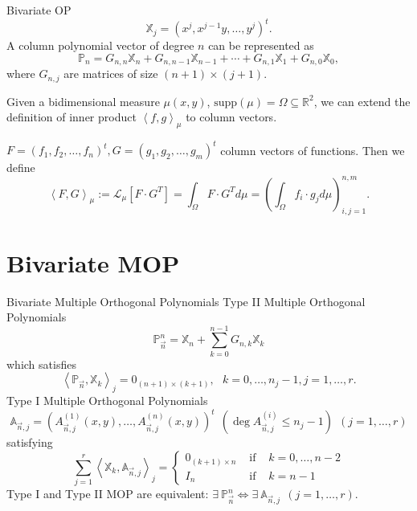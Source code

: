\documentclass[compress,aspectratio=169]{beamer}
\newcommand{\R}[0]{\mathbb{R}}
\newcommand{\supp}[0]{\mathrm{supp}}
\newcommand{\prodesc}[2]{\left\langle #1 , #2 \right\rangle}
\begin{document}
\begin{frame}{Bivariate OP}
  $$
  \mathbb{X}_j=(x^j, x^{j-1}y , \dots, y^j)^t.
  $$
  A column polynomial vector of degree $n$ can be represented as
  $$
  \mathbb{P}_n = G_{n,n}\mathbb{X}_n + G_{n,n-1}\mathbb{X}_{n-1}+\cdots + G_{n,1}\mathbb{X}_1 + G_{n,0}\mathbb X_0,
  $$
  where $G_{n,j}$ are matrices of size $(n+1)\times(j+1)$. 

  Given a bidimensional measure $\mu(x,y)$, $\supp(\mu)=\Omega\subseteq\R^2$, we can extend the definition of inner product $\prodesc{f}{g}_\mu$ to column vectors.
  
  $F=(f_1,f_2,\dots,f_n)^t, G=(g_1,g_2,\dots, g_m)^t$ column vectors of functions. Then we define
  \begin{equation}
    \label{eq:prodesc-matrix}
    \prodesc{F}{G}_\mu :=\mathcal{L}_\mu[F\cdot G^T] = \int_\Omega F\cdot G^T d\mu = \left(\int_\Omega f_i\cdot g_j d\mu\right)_{i,j=1}^{n,m}.
  \end{equation}
	
\end{frame}

\section*{Bivariate MOP}

\begin{frame}{Bivariate Multiple Orthogonal Polynomials}
	\alert{Type II Multiple Orthogonal Polynomials}
	$$\mathbb P^n_{\vec n} = \mathbb X_n + \displaystyle\sum_{k=0}^{n-1}G_{n,k} \mathbb X_k$$ which satisfies
	\begin{equation}
		\label{eq:typeII-MOP-d-variables}
		\prodesc{\mathbb P_{\vec n}}{\mathbb X_k}_j = 0_{(n+1)\times (k+1)}, \ \ \ k=0,\dots,n_j-1, j=1,\dots,r.
	\end{equation}
	\alert{Type I Multiple Orthogonal Polynomials}
	$$\mathbb A_{\vec n,j} = (A_{\vec n, j}^{(1)}(x,y), \dots, A_{\vec n, j}^{(n)}(x,y))^t \ \ (\deg A_{\vec n, j}^{(i)}\leq n_j-1)\ \ (j=1,\dots,r)$$ satisfying
	\begin{equation}
		\label{eq:condition-type-I}
		\sum_{j=1}^r \prodesc{\mathbb X_k}{\mathbb A_{\vec n,j}}_j = \left\{\begin{array}{ccl}
			0_{(k+1)\times n} &   \text{ if } & k=0,\dots,n-2 \\
			I_n & \text{ if } & k=n-1      
		\end{array}\right.
	\end{equation}	 
	Type I and Type II MOP are equivalent: $\exists \ \mathbb P_{\vec n}^n \Leftrightarrow \exists \   \mathbb A_{\vec n, j}\ \  (j=1,\dots,r)$.
  \end{frame}
\end{document}
